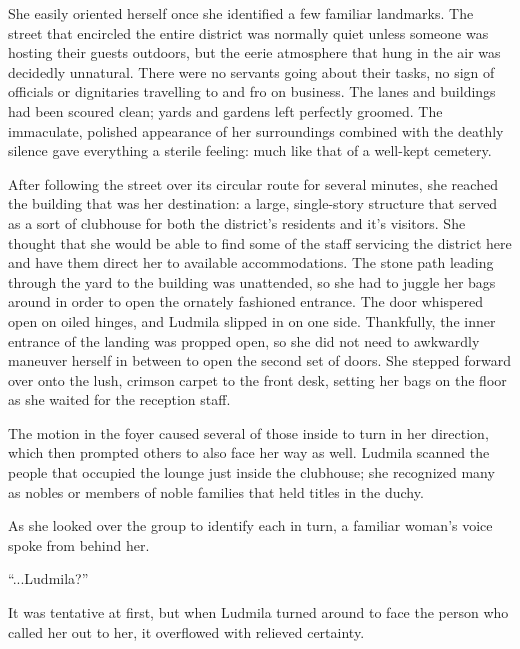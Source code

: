  

She easily oriented herself once she identified a few familiar landmarks. The street that encircled the entire district was normally quiet unless someone was hosting their guests outdoors, but the eerie atmosphere that hung in the air was decidedly unnatural. There were no servants going about their tasks, no sign of officials or dignitaries travelling to and fro on business. The lanes and buildings had been scoured clean; yards and gardens left perfectly groomed. The immaculate, polished appearance of her surroundings combined with the deathly silence gave everything a sterile feeling: much like that of a well-kept cemetery.

 

After following the street over its circular route for several minutes, she reached the building that was her destination: a large, single-story structure that served as a sort of clubhouse for both the district’s residents and it’s visitors. She thought that she would be able to find some of the staff servicing the district here and have them direct her to available accommodations. The stone path leading through the yard to the building was unattended, so she had to juggle her bags around in order to open the ornately fashioned entrance. The door whispered open on oiled hinges, and Ludmila slipped in on one side. Thankfully, the inner entrance of the landing was propped open, so she did not need to awkwardly maneuver herself in between to open the second set of doors. She stepped forward over onto the lush, crimson carpet to the front desk, setting her bags on the floor as she waited for the reception staff.

 

The motion in the foyer caused several of those inside to turn in her direction, which then prompted others to also face her way as well. Ludmila scanned the people that occupied the lounge just inside the clubhouse; she recognized many as nobles or members of noble families that held titles in the duchy.

 

As she looked over the group to identify each in turn, a familiar woman’s voice spoke from behind her.

 

“...Ludmila?”

 

It was tentative at first, but when Ludmila turned around to face the person who called her out to her, it overflowed with relieved certainty.

